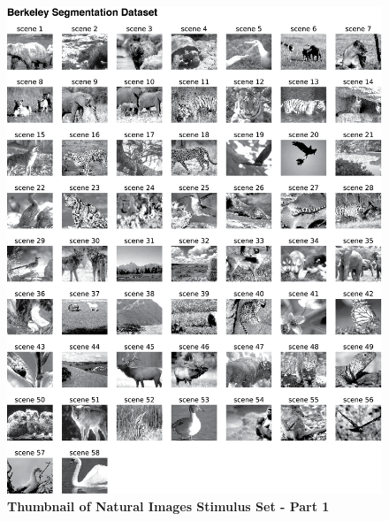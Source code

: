 \begin{figure}
  \centering
   \includegraphics[width=\textwidth,height=0.9\textheight,keepaspectratio]{Figures/chapter5/images_dataset1.png}
  \caption[Thumbnail of Natural Images Stimulus Set - Part 1]{\textbf{Thumbnail of Natural Images Stimulus Set - Part 1} }
   \label{fig:images1}
\end{figure}
